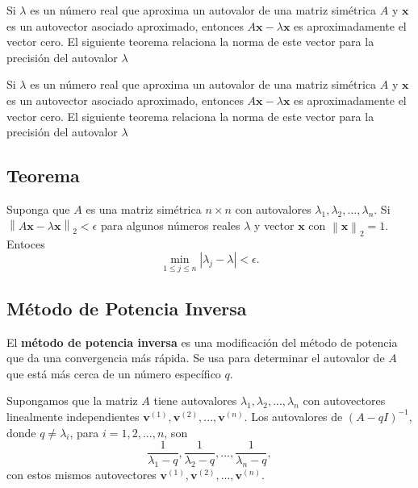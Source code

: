 \documentclass{report}
\numberwithin{subsection}{section} %
\begin{document}
Si $\lambda$ es un número real que aproxima un autovalor de una matriz simétrica $A$ y $\textbf{x}$ es un autovector asociado aproximado, entonces $A\textbf{x} - \lambda\textbf{x}$ es aproximadamente el vector cero. El siguiente teorema relaciona la norma de este vector para la precisión del autovalor $\lambda$

Si $\lambda$ es un número real que aproxima un autovalor de una matriz simétrica $A$ y $\textbf{x}$ es un autovector asociado aproximado, entonces $A\textbf{x} - \lambda\textbf{x}$ es aproximadamente el vector cero. El siguiente teorema relaciona la norma de este vector para la precisión del autovalor $\lambda$

\subsection{\textnormal{Teorema}}

Suponga que $A$ es una matriz simétrica $n\times n$ con autovalores $\lambda_{1}, \lambda_{2}, ..., \lambda_{n}$. Si $\left\| A\textbf{x} - \lambda\textbf{x} \right\|_{2}<\epsilon$ para algunos números reales $\lambda$ y vector $\textbf{x}$ con $\left\| \textbf{x} \right\|_{2} = 1$. Entoces
\begin{equation*}
\min_{1\le j\le n}\left| \lambda_{j}-\lambda \right| < \epsilon.
\end{equation*}

\subsection{\textnormal{Método de Potencia Inversa}}

El \textbf{método de potencia inversa} es una modificación del método de potencia que da una convergencia más rápida. Se usa para determinar el autovalor de $A$ que está más cerca de un número específico $q$.

Supongamos que la matriz $A$ tiene autovalores $\lambda_{1}, \lambda_{2}, ..., \lambda_{n}$ con autovectores linealmente independientes $\textbf{v}^{\left( 1 \right)}, \textbf{v}^{\left( 2 \right)}, ..., \textbf{v}^{\left( n \right)}$. Los autovalores de $\left( A - qI \right)^{-1}$, donde $q\neq \lambda_{i}$, para $i = 1, 2, ..., n$, son
\begin{equation*}
\frac{1}{\lambda_{1} - q}, \frac{1}{\lambda_{2} - q}, ..., \frac{1}{\lambda_{n} - q},
\end{equation*}
con estos mismos autovectores $\textbf{v}^{\left( 1 \right)}, \textbf{v}^{\left( 2 \right)}, ..., \textbf{v}^{\left( n \right)}$.
\end{document}
